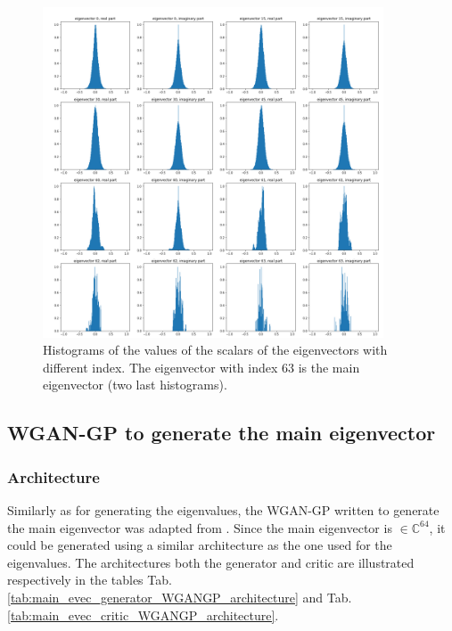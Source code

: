 \documentclass{article}
\begin{document}
\begin{figure}
    \centering
    \includegraphics[width=0.9\textwidth]{../figs/eigenvectors_histograms.png}
    \caption{Histograms of the values of the scalars of the eigenvectors with different index. The eigenvector with index $63$ is the main eigenvector (two last histograms).}
    \label{fig:eigenvectors_histograms}
\end{figure}


\subsection{WGAN-GP to generate the main eigenvector}

\subsubsection{Architecture}

Similarly as for generating the eigenvalues, the WGAN-GP written to generate the main eigenvector was adapted from \cite{nain2020wgangp}. Since the main eigenvector is $\in \mathbb{C}^{64}$, it could be generated using a similar architecture as the one used for the eigenvalues. The architectures both the generator and critic are illustrated respectively in the tables Tab.\ref{tab:main_evec_generator_WGANGP_architecture} and Tab.\ref{tab:main_evec_critic_WGANGP_architecture}.
\end{document}

